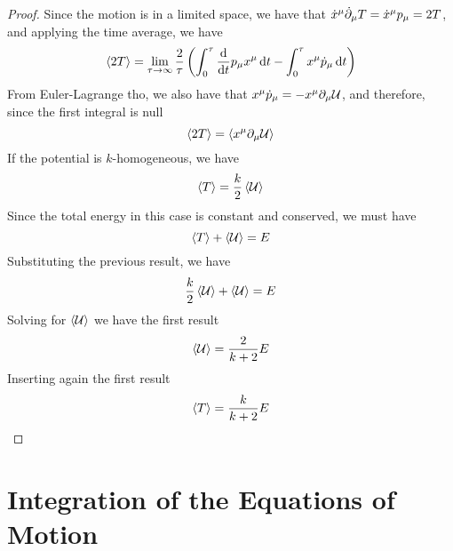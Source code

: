 \documentclass[../admech.tex]{subfiles}
\begin{document}
\begin{proof}
	Since the motion is in a limited space, we have that $\dot{x}^\mu\dot{\partial}_\mu T=\dot{x}^\mu p_\mu=2T$, and applying the time average, we have
	\begin{equation*}
		\expval{2T}=\lim_{\tau\to\infty}\frac{2}{\tau}\left(\int_{0}^{\tau}\dv{t}p_\mu x^\mu\dd{t}-\int_{0}^{\tau}x^\mu\dot{p}_\mu\dd{t}\right)
	\end{equation*}
	From Euler-Lagrange tho, we also have that $x^\mu\dot{p}_\mu=-x^\mu\partial_\mu\mathcal{U}$, and therefore, since the first integral is null
	\begin{equation*}
		\expval{2T}=\expval{x^\mu\partial_\mu\mathcal{U}}
	\end{equation*}
	If the potential is $k$-homogeneous, we have
	\begin{equation*}
		\expval{T}=\frac{k}{2}\expval{\mathcal{U}}
	\end{equation*}
	Since the total energy in this case is constant and conserved, we must have
	\begin{equation*}
		\expval{T}+\expval{\mathcal{U}}=E
	\end{equation*}
	Substituting the previous result, we have
	\begin{equation*}
		\frac{k}{2}\expval{\mathcal{U}}+\expval{\mathcal{U}}=E
	\end{equation*}
	Solving for $\expval{\mathcal{U}}$ we have the first result
	\begin{equation*}
		\expval{\mathcal{U}}=\frac{2}{k+2}E
	\end{equation*}
	Inserting again the first result
	\begin{equation*}
		\expval{T}=\frac{k}{k+2}E
	\end{equation*}
\end{proof}
\section{Integration of the Equations of Motion}
\end{document}
